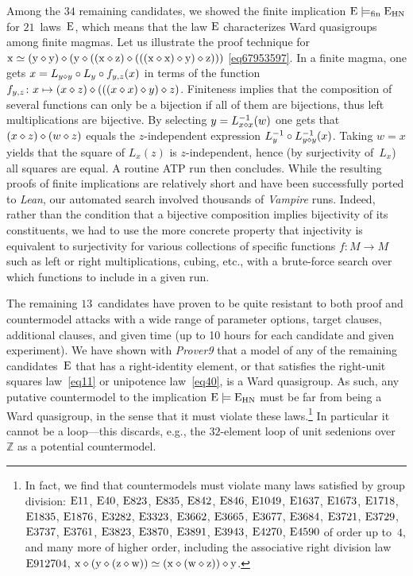 Among the $34$ remaining candidates, we showed the finite implication $\mathrm{E}\models_{\mathrm{fin}}\mathrm{E}_{\mathrm{HN}}$ for $21$~laws~$\mathrm{E}$, which means that the law $\mathrm{E}$ characterizes Ward quasigroups among finite magmas.  Let us illustrate the proof technique for $\mathrm{x} \simeq (\mathrm{y} \diamond \mathrm{y}) \diamond (\mathrm{y} \diamond ((\mathrm{x} \diamond \mathrm{z}) \diamond (((\mathrm{x} \diamond \mathrm{x}) \diamond \mathrm{y}) \diamond \mathrm{z})))$ \eqref{eq67953597}.  In a finite magma, one gets $x = L_{y\diamond y} \circ L_y \circ f_{y,z}(x)$ in terms of the function $f_{y,z}\colon x \mapsto (x\diamond z) \diamond (((x \diamond x) \diamond y) \diamond z)$.  Finiteness implies that the composition of several functions can only be a bijection if all of them are bijections, thus left multiplications are bijective.  By selecting $y=L_{x\diamond x}^{-1}(w)$ one gets that $(x\diamond z)\diamond (w\diamond z)$ equals the $z$-independent expression $L_y^{-1} \circ L_{y\diamond y}^{-1}(x)$.  Taking $w=x$ yields that the square of $L_x(z)$ is $z$-independent, hence (by surjectivity of~$L_x$) all squares are equal.  A routine ATP run then concludes.
While the resulting proofs of finite implications are relatively short and have been successfully ported to \emph{Lean}, our automated search involved thousands of \emph{Vampire} runs.
Indeed, rather than the condition that a bijective composition implies bijectivity of its constituents, we had to use the more concrete property that injectivity is equivalent to surjectivity for various collections of specific functions $f\colon M\to M$ such as left or right multiplications, cubing, etc.\@, with a brute-force search over which functions to include in a given run.

The remaining $13$~candidates have proven to be quite resistant to both proof and countermodel attacks with a wide range of parameter options, target clauses, additional clauses, and given time (up to 10 hours for each candidate and given experiment).  We have shown with \emph{Prover9} that a model of any of the remaining candidates~$\mathrm{E}$ that has a right-identity element, or that satisfies the right-unit squares law~\eqref{eq11} or unipotence law~\eqref{eq40}, is a Ward quasigroup.  As such, any putative countermodel to the implication $\mathrm{E}\models\mathrm{E}_{\mathrm{HN}}$ must be far from being a Ward quasigroup, in the sense that it must violate these laws.\footnote{In fact, we find that countermodels must violate many laws satisfied by group division: $\mathrm{E}11$, $\mathrm{E}40$, $\mathrm{E}823$, $\mathrm{E}835$, $\mathrm{E}842$, $\mathrm{E}846$, $\mathrm{E}1049$, $\mathrm{E}1637$, $\mathrm{E}1673$, $\mathrm{E}1718$, $\mathrm{E}1835$, $\mathrm{E}1876$, $\mathrm{E}3282$, $\mathrm{E}3323$, $\mathrm{E}3662$, $\mathrm{E}3665$, $\mathrm{E}3677$, $\mathrm{E}3684$, $\mathrm{E}3721$, $\mathrm{E}3729$, $\mathrm{E}3737$, $\mathrm{E}3761$, $\mathrm{E}3823$, $\mathrm{E}3870$, $\mathrm{E}3891$, $\mathrm{E}3943$, $\mathrm{E}4270$, $\mathrm{E}4590$ of order up to~$4$, and many more of higher order, including the associative right division law $\mathrm{E}912704$, $\mathrm{x}\diamond(\mathrm{y}\diamond(\mathrm{z}\diamond\mathrm{w})) \simeq(\mathrm{x}\diamond(\mathrm{w}\diamond\mathrm{z}))\diamond\mathrm{y}$.}  In particular it cannot be a loop---this discards, e.g., the $32$-element loop of unit sedenions over~$\mathbb{Z}$ as a potential countermodel.

